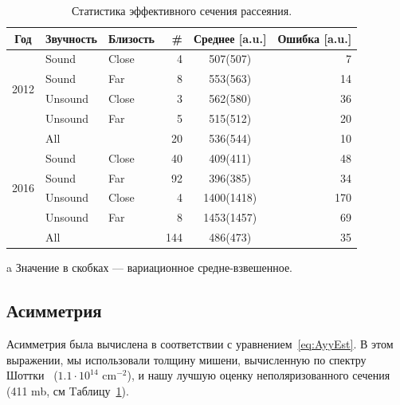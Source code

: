 \documentclass{article}
\begin{document}
	\begin{table}
		\centering
		\begin{threeparttable}
			\caption{Статистика эффективного сечения рассеяния. \label{tbl:CS-all}}
			\begin{tabular}{c|llrcr}
				\hline\hline
				         Год          & Звучность & Близость &  \# & Среднее\tnote{a} [a.u.] & Ошибка [a.u.] \\ \hline
				\multirow{4}{*}{2012} & Sound     & Close    &   4 &        507(507)         &             7 \\
				                      & Sound     & Far      &   8 &        553(563)         &            14 \\
				                      & Unsound   & Close    &   3 &        562(580)         &            36 \\
				                      & Unsound   & Far      &   5 &        515(512)         &            20 \\
				                      & All       &          &  20 &        536(544)         &            10 \\ \hline
				\multirow{4}{*}{2016} & Sound     & Close    &  40 &        409(411)         &            48 \\
				                      & Sound     & Far      &  92 &        396(385)         &            34 \\
				                      & Unsound   & Close    &   4 &       1400(1418)        &           170 \\
				                      & Unsound   & Far      &   8 &       1453(1457)        &            69 \\
				                      & All       &          & 144 &        486(473)         &            35 \\ \hline\hline
			\end{tabular}
			\begin{tablenotes}
				\item[a] Значение в скобках --- вариационное средне-взвешенное.
			\end{tablenotes}
		\end{threeparttable}
	\end{table}	

	\subsection{Асимметрия}\label{sec:Asymmetry}	
	Асимметрия была вычислена в соответствии с уравнением~\eqref{eq:AyyEst}. В этом выражении, мы использовали толщину мишени, вычисленную по спектру Шоттки~\cite{Stein} ($1.1\cdot 10^{14}$ cm$^{-2}$), и нашу лучшую оценку неполяризованного сечения (411 mb, см Tаблицу~\ref{tbl:CS-all}).
	
\end{document}
